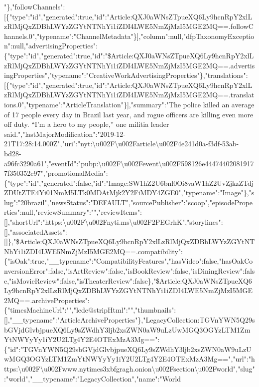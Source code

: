 "\},"followChannels":{[}\{"type":"id","generated":true,"id":"Article:QXJ0aWNsZTpueXQ6Ly9hcnRpY2xlLzRlMjQxZDBhLWYzZGYtNTNhYi1iZDI4LWE5NmZjMzI5MGE2MQ==.followChannels.0","typename":"ChannelMetadata"\}{]},"column":null,"dfpTaxonomyException":null,"advertisingProperties":\{"type":"id","generated":true,"id":"\$Article:QXJ0aWNsZTpueXQ6Ly9hcnRpY2xlLzRlMjQxZDBhLWYzZGYtNTNhYi1iZDI4LWE5NmZjMzI5MGE2MQ==.advertisingProperties","typename":"CreativeWorkAdvertisingProperties"\},"translations":{[}\{"type":"id","generated":true,"id":"Article:QXJ0aWNsZTpueXQ6Ly9hcnRpY2xlLzRlMjQxZDBhLWYzZGYtNTNhYi1iZDI4LWE5NmZjMzI5MGE2MQ==.translations.0","typename":"ArticleTranslation"\}{]},"summary":"The
police killed an average of 17 people every day in Brazil last year, and
rogue officers are killing even more off duty. ``I'm a hero to my
people,'' one militia leader
said.","lastMajorModification":"2019-12-21T17:28:14.000Z","uri":"nyt:\textbackslash{}u002F\textbackslash{}u002Farticle\textbackslash{}u002F4e241d0a-f3df-53ab-bd28-a96fc3290a61","eventId":"pubp:\textbackslash{}u002F\textbackslash{}u002Fevent\textbackslash{}u002F598126e444744020819177f350352c97","promotionalMedia":\{"type":"id","generated":false,"id":"Image:SW1hZ2U6bnl0Oi8vaW1hZ2UvZjkzZTdjZDUtZTE4Yi01NmM5LTk0MDAtMjk2Y2FiMDY4ZGE0","typename":"Image"\},"slug":"20brazil","newsStatus":"DEFAULT","sourcePublisher":"scoop","episodeProperties":null,"reviewSummary":"","reviewItems":{[}{]},"shortUrl":"https:\textbackslash{}u002F\textbackslash{}u002Fnyti.ms\textbackslash{}u002F2PEGrhK","storylines":{[}{]},"associatedAssets":{[}{]}\},"\$Article:QXJ0aWNsZTpueXQ6Ly9hcnRpY2xlLzRlMjQxZDBhLWYzZGYtNTNhYi1iZDI4LWE5NmZjMzI5MGE2MQ==.compatibility":\{"isOak":true,"\_\_typename":"CompatibilityFeatures","hasVideo":false,"hasOakConversionError":false,"isArtReview":false,"isBookReview":false,"isDiningReview":false,"isMovieReview":false,"isTheaterReview":false\},"\$Article:QXJ0aWNsZTpueXQ6Ly9hcnRpY2xlLzRlMjQxZDBhLWYzZGYtNTNhYi1iZDI4LWE5NmZjMzI5MGE2MQ==.archiveProperties":\{"timesMachineUrl":"","lede@stripHtml":"","thumbnails":{[}{]},"\_\_typename":"ArticleArchiveProperties"\},"LegacyCollection:TGVnYWN5Q29sbGVjdGlvbjpueXQ6Ly9sZWdhY3ljb2xsZWN0aW9uLzUwMGQ3OGYzLTM1ZmYtNWYyYy1iY2U2LTg4Y2E4OTExMzA3Mg==":\{"id":"TGVnYWN5Q29sbGVjdGlvbjpueXQ6Ly9sZWdhY3ljb2xsZWN0aW9uLzUwMGQ3OGYzLTM1ZmYtNWYyYy1iY2U2LTg4Y2E4OTExMzA3Mg==","url":"https:\textbackslash{}u002F\textbackslash{}u002Fwww.nytimes3xbfgragh.onion\textbackslash{}u002Fsection\textbackslash{}u002Fworld","slug":"world","\_\_typename":"LegacyCollection","name":"World
